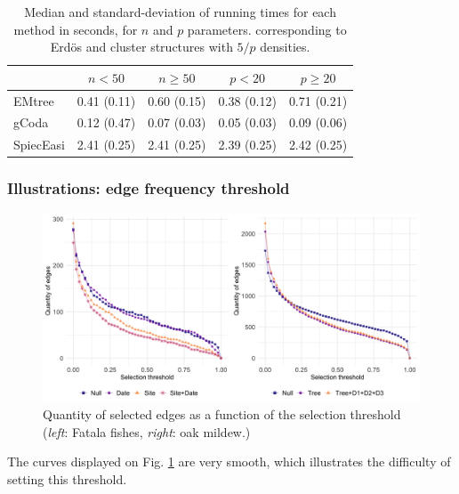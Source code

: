 \begin{table}[H]
\centering
\begin{tabular}{l|rr|rr}
    & \multicolumn{1}{c}{$n < 50$} & \multicolumn{1}{c}{$n\geq 50$} & \multicolumn{1}{c}{$p < 20$} & \multicolumn{1}{c}{$p\geq 20$} \\  \hline
  EMtree    &   0.41 (0.11)	&   0.60 (0.15) &   0.38 (0.12) &    0.71 (0.21)      \\ 
  gCoda     &   0.12 (0.47)	&   0.07 (0.03) &   0.05 (0.03) &    0.09 (0.06)     \\ 
  SpiecEasi &   2.41 (0.25)	&   2.41 (0.25) &   2.39 (0.25) &    2.42 (0.25)      \\ 
   \hline
\end{tabular}
\caption{Median and standard-deviation of running times for each method in seconds, for $n$ and $p$ parameters. corresponding to Erdös and cluster structures with $5/p$ densities.}
\label{timeDenser}
\end{table}
 
\subsubsection{Illustrations: edge frequency threshold}

\begin{figure}[H]
    \centering
    \includegraphics[width=\linewidth]{figs/QET_twoDataSets.png}
    \caption{Quantity of selected edges as a function of the selection threshold (\textit{left}: Fatala fishes, \textit{right}: oak mildew.)}
    \label{QETOak}
\end{figure}

The curves displayed on Fig. \ref{QETOak} are very smooth, which illustrates the difficulty of setting this threshold.


